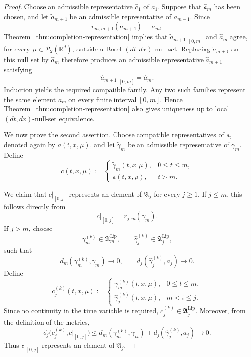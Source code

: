 \documentclass[12pt,oneside, reqno]{amsart}
\numberwithin{equation}{section}
\begin{document}
\begin{proof}
	Choose an admissible representative \(\widehat a_1\) of \(a_1\).
	Suppose that \(\widehat a_m\) has been chosen, and let
	\(\widetilde a_{m+1}\) be an admissible representative of \(a_{m+1}\).
	Since
	\[
	r_{m,m+1}(a_{m+1})=a_m,
	\]
	Theorem~\ref{thm:completion-representation} implies that
	\(\widetilde a_{m+1}|_{[0,m]}\) and \(\widehat a_m\) agree, for every
	\(\mu\in\mathcal P_2(\mathbb R^d)\), outside a Borel
	\((dt,dx)\)-null set. Replacing
	\(\widetilde a_{m+1}\) on this null set by \(\widehat a_m\) therefore
	produces an admissible representative \(\widehat a_{m+1}\) satisfying
	\[
	\widehat a_{m+1}|_{[0,m]}=\widehat a_m.
	\]
	Induction yields the required compatible family. Any two such families
	represent the same element \(a_m\) on every finite interval \([0,m]\).
	Hence Theorem~\ref{thm:completion-representation} also gives uniqueness
	up to local \((dt,dx)\)-null-set equivalence.
	
	We now prove the second assertion. Choose compatible representatives of
	\(a\), denoted again by \(a(t,x,\mu)\), and let
	\(\widetilde\gamma_m\) be an admissible representative of
	\(\gamma_m\). Define
	\[
	c(t,x,\mu)
	:=
	\begin{cases}
		\widetilde\gamma_m(t,x,\mu), & 0\leq t\leq m,\\
		a(t,x,\mu), & t>m.
	\end{cases}
	\]
	
	We claim that \(c|_{[0,j]}\) represents an element of
	\(\mathfrak A_j\) for every \(j\geq1\). If \(j\leq m\), this follows
	directly from
	\[
	c|_{[0,j]}
	=
	r_{j,m}(\gamma_m).
	\]
	If \(j>m\), choose
	\[
	\gamma_m^{(k)}\in\mathfrak A_m^{\mathrm{Lip}},
	\qquad
	\widehat{\gamma}_j^{(k)}\in\mathfrak A_j^{\mathrm{Lip}},
	\]
	such that
	\[
	d_m(\gamma_m^{(k)},\gamma_m)\to0,
	\qquad
	d_j(\widehat{\gamma}_j^{(k)},a_j)\to0.
	\]
	Define
	\[
	c_j^{(k)}(t,x,\mu)
	:=
	\begin{cases}
		\gamma_m^{(k)}(t,x,\mu), & 0\leq t\leq m,\\
		\widehat{\gamma}_j^{(k)}(t,x,\mu), & m<t\leq j.
	\end{cases}
	\]
	Since no continuity in the time variable is required,
	\(c_j^{(k)}\in\mathfrak A_j^{\mathrm{Lip}}\). Moreover, from the
	definition of the metrics,
	\[
	d_j\bigl(c_j^{(k)},c|_{[0,j]}\bigr)
	\leq
	d_m(\gamma_m^{(k)},\gamma_m)
	+
	d_j(\widehat{\gamma}_j^{(k)},a_j)
	\longrightarrow0.
	\]
	Thus \(c|_{[0,j]}\) represents an element of \(\mathfrak A_j\).
	

\end{proof}
\end{document}
